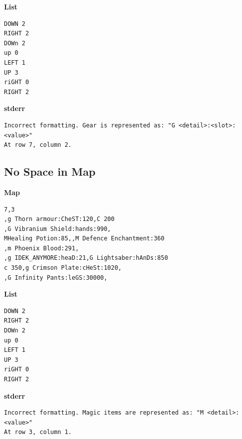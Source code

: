 \documentclass{article}
\begin{document}
\textbf{List}
\begin{lstlisting}
DOWN 2
RIGHT 2
DOWn 2
up 0
LEFT 1
UP 3
riGHT 0
RIGHT 2
\end{lstlisting}
\pagebreak

\textbf{stderr}
\begin{lstlisting}
Incorrect formatting. Gear is represented as: "G <detail>:<slot>:<value>"
At row 7, column 2.
\end{lstlisting}

\subsection{No Space in Map}

\quad \textbf{Map}
\begin{lstlisting}
7,3
,g Thorn armour:CheST:120,C 200
,G Vibranium Shield:hands:990,
MHealing Potion:85,,M Defence Enchantment:360
,m Phoenix Blood:291,
,g IDEK_ANYMORE:heaD:21,G Lightsaber:hAnDs:850
c 350,g Crimson Plate:cHeSt:1020,
,G Infinity Pants:leGS:30000,
\end{lstlisting}

\textbf{List}
\begin{lstlisting}
DOWN 2
RIGHT 2
DOWn 2
up 0
LEFT 1
UP 3
riGHT 0
RIGHT 2
\end{lstlisting}
\pagebreak

\textbf{stderr}
\begin{lstlisting}
Incorrect formatting. Magic items are represented as: "M <detail>:<value>"
At row 3, column 1.
\end{lstlisting}
\end{document}

